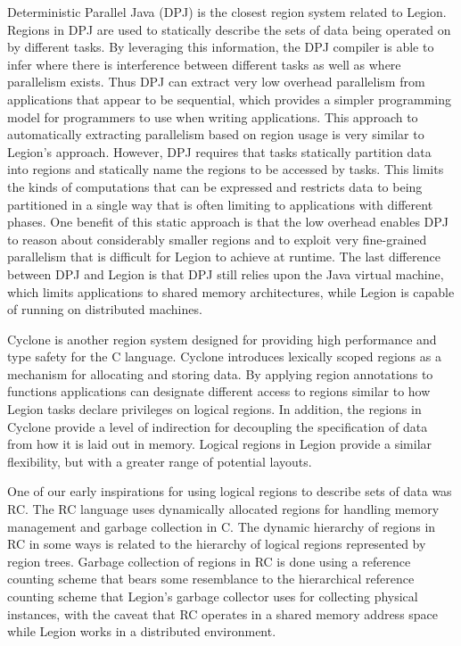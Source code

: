 Deterministic Parallel Java (DPJ) \cite{DPJ09,DPJ11}
is the closest region system related to Legion. Regions in 
DPJ are used to statically describe the sets of 
data being operated on by different tasks. By
leveraging this information, the DPJ compiler is
able to infer where there is interference between
different tasks as well as where parallelism
exists. Thus DPJ can extract very low overhead
parallelism from applications that appear to be
sequential, which provides a simpler programming
model for programmers to use when writing
applications. This approach to automatically
extracting parallelism based on region usage
is very similar to Legion's approach. However,
DPJ requires that tasks statically partition
data into regions and statically name the regions
to be accessed by tasks. This limits the kinds
of computations that can be expressed and restricts
data to being partitioned in a single way that 
is often limiting to applications with different
phases. One benefit of this static approach is that
the low overhead enables DPJ to reason about 
considerably smaller regions and to exploit very
fine-grained parallelism that is difficult for
Legion to achieve at runtime. The last difference
between DPJ and Legion is that DPJ still relies
upon the Java virtual machine, which limits 
applications to shared memory architectures, while
Legion is capable of running on distributed machines.

Cyclone\cite{Cyclone02} is another region system 
designed for providing high performance and type
safety for the C language. Cyclone introduces
lexically scoped regions as a mechanism for 
allocating and storing data. By applying region annotations
to functions applications can designate different
access to regions similar to how Legion tasks
declare privileges on logical regions. In addition,
the regions in Cyclone provide a level of indirection
for decoupling the specification of data from how
it is laid out in memory. Logical regions in Legion
provide a similar flexibility, but with a greater
range of potential layouts.

One of our early inspirations for using logical
regions to describe sets of data was RC\cite{RC01}.
The RC language uses dynamically allocated regions
for handling memory management and garbage
collection in C. The dynamic hierarchy of regions
in RC in some ways is related to the hierarchy
of logical regions represented by region trees.
Garbage collection of regions in RC is done using
a reference counting scheme that bears some
resemblance to the hierarchical reference counting
scheme that Legion's garbage collector uses for
collecting physical instances, with the caveat that
RC operates in a shared memory address space while
Legion works in a distributed environment.

